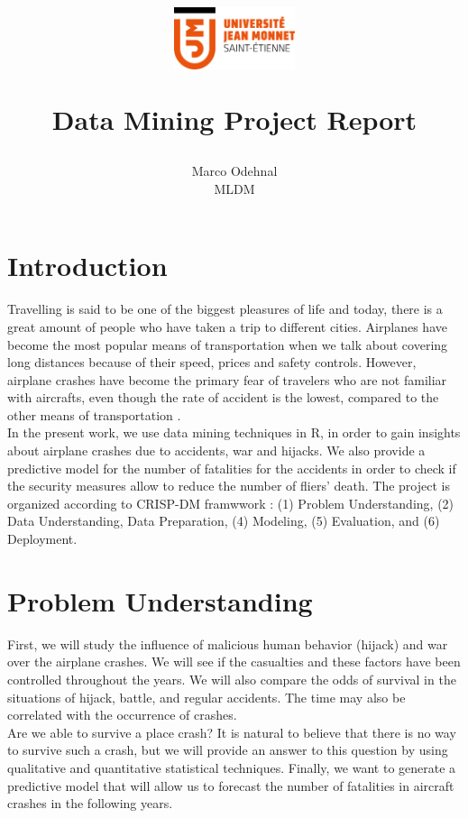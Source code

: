 \documentclass[12pt]{article}
\title{
\vspace{-30mm}\begin{figure}[h]
\centering
\includegraphics[width=1.4in]{logoUJM}
\label{escudo}
\end{figure}Data Mining Project Report}
\author{Marco Odehnal\\MLDM}
\begin{document}

	
\maketitle
\section*{Introduction}
\par{Travelling is said to be one of the biggest pleasures of life and today, there is a great amount of people who have taken a trip to different cities. Airplanes have become the most popular means of transportation when we talk about covering long distances because of their speed, prices and safety controls. However, airplane crashes have become the primary fear of travelers who are not familiar with aircrafts, even though the rate of accident is the lowest, compared to the other means of transportation \cite{bib:crashtransport}.}\\

In the present work, we use data mining techniques in R, in order to gain insights about airplane crashes due to accidents, war and hijacks. We also provide a predictive model for the number of fatalities for the accidents in order to check if the security measures allow to reduce the number of fliers' death. The project is organized according to CRISP-DM framwwork \cite{bib:crisp}: (1) Problem Understanding, (2) Data Understanding, Data Preparation, (4) Modeling, (5) Evaluation, and (6) Deployment.

\section{Problem Understanding}
First, we will study the influence of malicious human behavior (hijack) and war over the airplane crashes. We will see if the casualties and these factors have been controlled throughout the years. We will also compare the odds of survival in the situations of hijack, battle, and regular accidents. The time may also be correlated with the occurrence of crashes.\\

Are we able to survive a place crash? It is natural to believe that there is no way to survive such a crash, but we will provide an answer to this question by using qualitative and quantitative statistical techniques. Finally, we want to generate a predictive model that will allow us to forecast the number of fatalities in aircraft crashes in the following years. 
\end{document}

